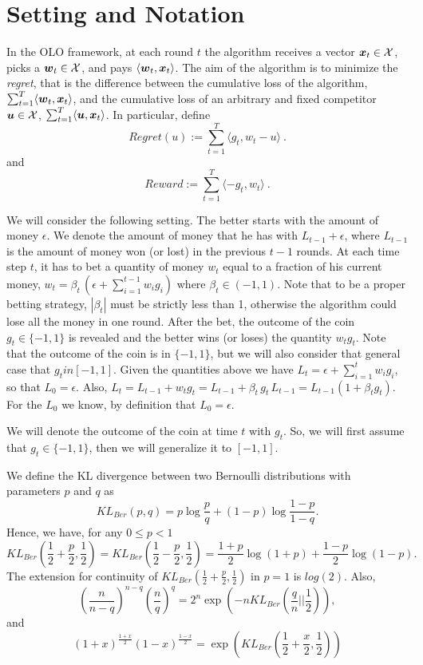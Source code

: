 \section{Setting and Notation}
In the \ac{OLO} framework, at each round $t$ the algorithm receives a vector $\boldsymbol{x}_t \in \mathcal{X}$, picks a $\boldsymbol{w}_t \in \mathcal{X}$, and pays $\langle \boldsymbol{w}_t,\boldsymbol{x}_t \rangle$.
The aim of the algorithm is to minimize the \emph{regret}, that is the difference between the cumulative loss of the algorithm, $\sum_{t=1}^T \langle \boldsymbol{w}_t,\boldsymbol{x}_t \rangle$, and the cumulative loss of an arbitrary and fixed competitor $\boldsymbol{u} \in \mathcal{X}$, $\sum_{t=1}^T \langle \boldsymbol{u},\boldsymbol{x}_t \rangle$.
In particular, define
\[
Regret(u) := \sum_{t=1}^T \langle g_t ,w_t - u \rangle~.
\]
and
\[
Reward := \sum_{t=1}^T \langle -g_t, w_t \rangle~.
\]


We will consider the following setting. The better starts with the amount of money $\epsilon$. We denote the amount of money that he has with $L_{t-1}+\epsilon$, where $L_{t-1}$ is the amount of money won (or lost) in the previous $t-1$ rounds.
At each time step $t$, it has to bet a quantity of money $w_t$ equal to a fraction of his current money, $w_t=\beta_t \, (\epsilon+\sum_{i=1}^{t-1} w_i g_i)$ where $\beta_t \in (-1,1)$. Note that to be a proper betting strategy, $|\beta_t|$ must be strictly less than 1, otherwise the algorithm could lose all the money in one round.
After the bet, the outcome of the coin $g_t \in \{-1,1\}$ is revealed and the better wins (or loses) the quantity $w_t g_t$.
Note that the outcome of the coin is in $\{-1,1\}$, but we will also consider that general case that $g_t in [-1,1]$.
Given the quantities above we have $L_t=\epsilon + \sum_{i=1}^t w_i g_i$, so that $L_0=\epsilon$.
Also, $L_t= L_{t-1}+w_t g_t =L_{t-1} + \beta_t \, g_t \, L_{t-1} = L_{t-1} (1+\beta_t g_t)$.
For the $L_0$ we know, by definition that $L_0=\epsilon$.

We will denote the outcome of the coin at time $t$ with $g_t$. So, we will first assume that $g_t \in \{-1,1\}$, then we will generalize it to $[-1,1]$.

We define the KL divergence between two Bernoulli distributions with parameters $p$ and $q$ as
\[
KL_{Ber}(p,q)= p \log\frac{p}{q} + (1-p) \log\frac{1-p}{1-q}.
\]
Hence, we have, for any $ 0\leq p < 1$
\[
KL_{Ber}(\frac{1}{2}+\frac{p}{2},\frac{1}{2}) = KL_{Ber}(\frac{1}{2}-\frac{p}{2},\frac{1}{2})= \frac{1+p}{2} \log(1+p) + \frac{1-p}{2} \log(1-p).
\]
The extension for continuity of $KL_{Ber}(\frac{1}{2}+\frac{p}{2},\frac{1}{2})$ in $p=1$ is $log(2)$.
Also,
\[
\left(\frac{n}{n-q}\right)^{n-q} \left(\frac{n}{q}\right)^{q} = 2^n \exp\left(-n KL_{Ber}(\frac{q}{n}||\frac{1}{2})\right),
\]
and
\[
\left(1+x\right)^\frac{1+x}{2} \left(1-x\right)^\frac{1-x}{2}= \exp\left( KL_{Ber}(\frac{1}{2}+\frac{x}{2},\frac{1}{2}) \right)
\]

